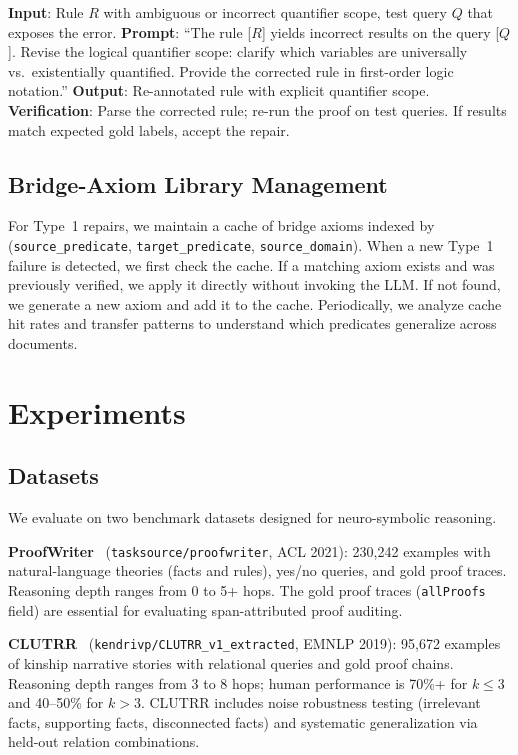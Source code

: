 \documentclass[11pt,letterpaper]{article}
\begin{document}
\textbf{Input}: Rule $R$ with ambiguous or incorrect quantifier scope, test query $Q$ that exposes the error.
\textbf{Prompt}: ``The rule [$R$] yields incorrect results on the query [$Q$]. Revise the logical quantifier scope: clarify which variables are universally vs.\ existentially quantified. Provide the corrected rule in first-order logic notation.''
\textbf{Output}: Re-annotated rule with explicit quantifier scope.
\textbf{Verification}: Parse the corrected rule; re-run the proof on test queries. If results match expected gold labels, accept the repair.

\subsection{Bridge-Axiom Library Management}

For Type~1 repairs, we maintain a cache of bridge axioms indexed by (\texttt{source\_predicate}, \texttt{target\_predicate}, \texttt{source\_domain}). When a new Type~1 failure is detected, we first check the cache. If a matching axiom exists and was previously verified, we apply it directly without invoking the LLM. If not found, we generate a new axiom and add it to the cache. Periodically, we analyze cache hit rates and transfer patterns to understand which predicates generalize across documents.

\section{Experiments}
\label{sec:experiments}

\subsection{Datasets}

We evaluate on two benchmark datasets designed for neuro-symbolic reasoning.

\textbf{ProofWriter}~\citep{Tafjord2020} (\texttt{tasksource/proofwriter}, ACL 2021): 230,242 examples with natural-language theories (facts and rules), yes/no queries, and gold proof traces. Reasoning depth ranges from 0 to 5+ hops. The gold proof traces (\texttt{allProofs} field) are essential for evaluating span-attributed proof auditing.

\textbf{CLUTRR}~\citep{Sinha2019} (\texttt{kendrivp/CLUTRR\_v1\_extracted}, EMNLP 2019): 95,672 examples of kinship narrative stories with relational queries and gold proof chains. Reasoning depth ranges from 3 to 8 hops; human performance is 70\%+ for $k \le 3$ and 40--50\% for $k > 3$. CLUTRR includes noise robustness testing (irrelevant facts, supporting facts, disconnected facts) and systematic generalization via held-out relation combinations.
\end{document}
